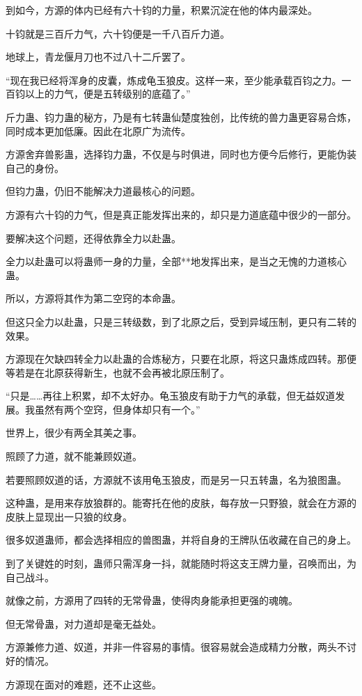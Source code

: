\begin{this_body}
到如今，方源的体内已经有六十钧的力量，积累沉淀在他的体内最深处。

十钧就是三百斤力气，六十钧便是一千八百斤力道。

地球上，青龙偃月刀也不过八十二斤罢了。

“现在我已经将浑身的皮囊，炼成龟玉狼皮。这样一来，至少能承载百钧之力。一百钧以上的力气，便是五转级别的底蕴了。”

斤力蛊、钧力蛊的秘方，乃是有七转蛊仙楚度独创，比传统的兽力蛊更容易合炼，同时成本更加低廉。因此在北原广为流传。

方源舍弃兽影蛊，选择钧力蛊，不仅是与时俱进，同时也方便今后修行，更能伪装自己的身份。

但钧力蛊，仍旧不能解决力道最核心的问题。

方源有六十钧的力气，但是真正能发挥出来的，却只是力道底蕴中很少的一部分。

要解决这个问题，还得依靠全力以赴蛊。

全力以赴蛊可以将蛊师一身的力量，全部**地发挥出来，是当之无愧的力道核心蛊。

所以，方源将其作为第二空窍的本命蛊。

但这只全力以赴蛊，只是三转级数，到了北原之后，受到异域压制，更只有二转的效果。

方源现在欠缺四转全力以赴蛊的合炼秘方，只要在北原，将这只蛊炼成四转。那便等若是在北原获得新生，也就不会再被北原压制了。

“只是……再往上积累，却不太好办。龟玉狼皮有助于力气的承载，但无益奴道发展。我虽然有两个空窍，但身体却只有一个。”

世界上，很少有两全其美之事。

照顾了力道，就不能兼顾奴道。

若要照顾奴道的话，方源就不该用龟玉狼皮，而是另一只五转蛊，名为狼图蛊。

这种蛊，是用来存放狼群的。能寄托在他的皮肤，每存放一只野狼，就会在方源的皮肤上显现出一只狼的纹身。

很多奴道蛊师，都会选择相应的兽图蛊，并将自身的王牌队伍收藏在自己的身上。

到了关键姓的时刻，蛊师只需浑身一抖，就能随时将这支王牌力量，召唤而出，为自己战斗。

就像之前，方源用了四转的无常骨蛊，使得肉身能承担更强的魂魄。

但无常骨蛊，对力道却是毫无益处。

方源兼修力道、奴道，并非一件容易的事情。很容易就会造成精力分散，两头不讨好的情况。

方源现在面对的难题，还不止这些。


\end{this_body}
